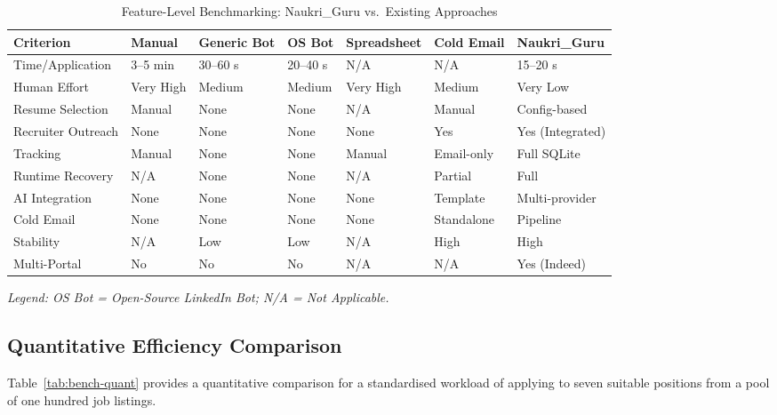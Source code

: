 \documentclass[12pt, a4paper, oneside]{report}
\begin{document}
\begin{table}[H]
\centering
\caption{Feature-Level Benchmarking: Naukri\_Guru vs.\ Existing Approaches}
\label{tab:bench-features}
\small
\begin{tabularx}{\textwidth}{|l|l|l|l|l|l|l|}
\hline
\textbf{Criterion} & \textbf{Manual} & \textbf{Generic Bot} & \textbf{OS Bot} & \textbf{Spreadsheet} & \textbf{Cold Email} & \textbf{Naukri\_Guru} \\
\hline
Time/Application & 3--5 min & 30--60 s & 20--40 s & N/A & N/A & 15--20 s \\
\hline
Human Effort & Very High & Medium & Medium & Very High & Medium & Very Low \\
\hline
Resume Selection & Manual & None & None & N/A & Manual & Config-based \\
\hline
Recruiter Outreach & None & None & None & None & Yes & Yes (Integrated) \\
\hline
Tracking & Manual & None & None & Manual & Email-only & Full SQLite \\
\hline
Runtime Recovery & N/A & None & None & N/A & Partial & Full \\
\hline
AI Integration & None & None & None & None & Template & Multi-provider \\
\hline
Cold Email & None & None & None & None & Standalone & Pipeline \\
\hline
Stability & N/A & Low & Low & N/A & High & High \\
\hline
Multi-Portal & No & No & No & N/A & N/A & Yes (Indeed) \\
\hline
\end{tabularx}
\end{table}

\noindent\textit{Legend: OS Bot = Open-Source LinkedIn Bot; N/A = Not Applicable.}

\subsection{Quantitative Efficiency Comparison}

Table~\ref{tab:bench-quant} provides a quantitative comparison for a standardised workload of applying to seven suitable positions from a pool of one hundred job listings.
\end{document}
